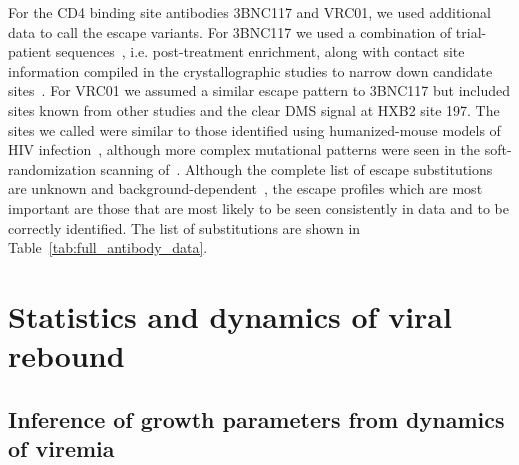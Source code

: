 \documentclass[11pt]{article}
\begin{document}
For the CD4 binding site antibodies 3BNC117 and VRC01, we used additional data to call the escape variants. For 3BNC117 we used a combination of trial-patient sequences~\cite{Caskey:2015hm,scheidHIV1Antibody3BNC1172016}, 
i.e. post-treatment enrichment, along with contact site information compiled in the  crystallographic studies to narrow down candidate sites~\cite{zhouStructuralRepertoireHIV1neutralizing2015, labrancheHIV1EnvelopeGlycan2018}.
For VRC01 we assumed a similar escape pattern to 3BNC117 but included sites known from other studies \cite{lynchHIV1FitnessCost2015} and the clear DMS signal at HXB2 site 197.
The sites we called were similar to those identified using humanized-mouse models of HIV infection~\cite{horwitzHIV1SuppressionDurable2013a}, although more complex mutational patterns were seen in the soft-randomization scanning of~\cite{otsukaDiversePathwaysEscape2018}.
Although the complete list of escape substitutions are unknown and background-dependent~\cite{otsukaDiversePathwaysEscape2018}, the escape profiles which are most important are those that are most likely to be seen consistently in data and to be correctly identified.
The list of substitutions are shown in Table~\ref{tab:full_antibody_data}. 


\section{Statistics and dynamics of viral rebound}

\subsection{Inference of growth parameters from dynamics of viremia}
\end{document}

